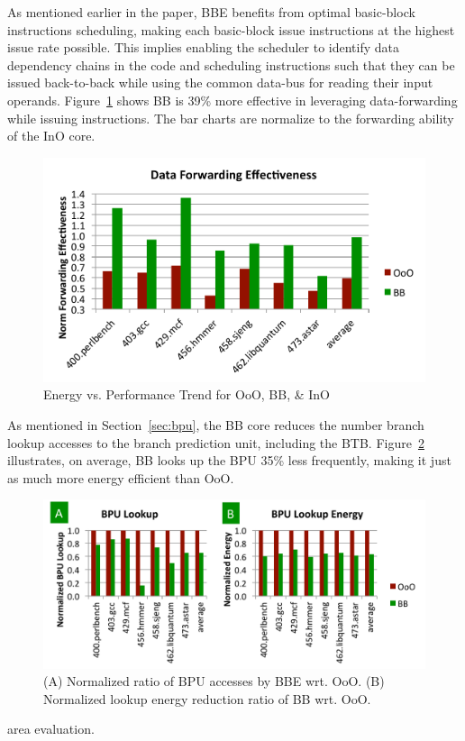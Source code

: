 As mentioned earlier in the paper, BBE benefits from optimal basic-block
instructions scheduling, making each basic-block issue instructions at the
highest issue rate possible. This implies enabling the scheduler to identify
data dependency chains in the code and scheduling instructions such that they
can be issued back-to-back while using the common data-bus for reading their
input operands. Figure~\ref{fig:forwarding} shows BB is 39\% more effective in
leveraging data-forwarding while issuing instructions. The bar charts are
normalize to the forwarding ability of the InO core. 
\begin{figure}[!htbp]
	\centering
	\includegraphics[width=1.0\columnwidth]{result/forwarding.pdf} 
    \caption{Energy vs. Performance Trend for OoO, BB, \& InO}
	\label{fig:forwarding}
\end{figure}

As mentioned in Section~\ref{sec:bpu}, the BB core reduces the number branch
lookup accesses to the branch prediction unit, including the BTB.
Figure~\ref{fig:bpu} illustrates, on average, BB looks up the BPU 35\% less
frequently, making it just as much more energy efficient than OoO.
\begin{figure}[!htbp]
	\centering
	\includegraphics[width=1.0\columnwidth]{result/bpu.pdf} 
    \caption{(A) Normalized ratio of BPU accesses by BBE wrt. OoO. (B)
        Normalized lookup energy reduction ratio of BB wrt. OoO.}
	\label{fig:bpu}
\end{figure}


area evaluation.



